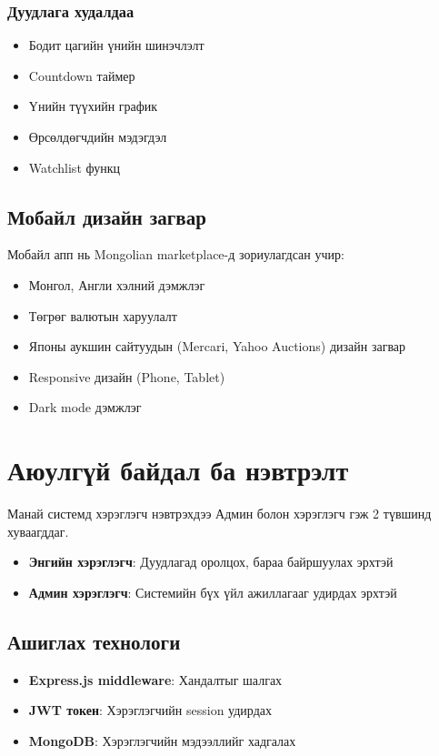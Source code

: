 \subsubsection{Дуудлага худалдаа}
\begin{itemize}
    \item Бодит цагийн үнийн шинэчлэлт
    \item Countdown таймер
    \item Үнийн түүхийн график
    \item Өрсөлдөгчдийн мэдэгдэл
    \item Watchlist функц
\end{itemize}

\subsection{Мобайл дизайн загвар}
Мобайл апп нь Mongolian marketplace-д зориулагдсан учир:
\begin{itemize}
    \item Монгол, Англи хэлний дэмжлэг
    \item Төгрөг валютын харуулалт
    \item Японы аукшин сайтуудын (Mercari, Yahoo Auctions) дизайн загвар
    \item Responsive дизайн (Phone, Tablet)
    \item Dark mode дэмжлэг
\end{itemize}

 \section{Аюулгүй байдал ба нэвтрэлт}
Манай системд хэрэглэгч нэвтрэхдээ Админ болон хэрэглэгч гэж 2 түвшинд хуваагддаг.
\begin{itemize}
\item \textbf{Энгийн хэрэглэгч}: Дуудлагад оролцох, бараа байршуулах эрхтэй
\item \textbf{Админ хэрэглэгч}: Системийн бүх үйл ажиллагааг удирдах эрхтэй
\end{itemize}

\subsection{Ашиглах технологи}
\begin{itemize}
\item \textbf{Express.js middleware}: Хандалтыг шалгах
\item \textbf{JWT токен}: Хэрэглэгчийн session удирдах
\item \textbf{MongoDB}: Хэрэглэгчийн мэдээллийг хадгалах
\end{itemize}
